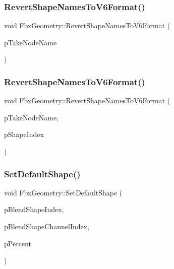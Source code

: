\subsubsection{\texorpdfstring{Revert\+Shape\+Names\+To\+V6\+Format()}{RevertShapeNamesToV6Format()}\hspace{0.1cm}{\footnotesize\ttfamily [1/2]}}
{\footnotesize\ttfamily void Fbx\+Geometry\+::\+Revert\+Shape\+Names\+To\+V6\+Format (\begin{DoxyParamCaption}\item[{\hyperlink{class_fbx_string}{Fbx\+String}}]{p\+Take\+Node\+Name }\end{DoxyParamCaption})}

\mbox{\label{class_fbx_geometry_a408862417553440cefa975d1366985bb}} 
\subsubsection{\texorpdfstring{Revert\+Shape\+Names\+To\+V6\+Format()}{RevertShapeNamesToV6Format()}\hspace{0.1cm}{\footnotesize\ttfamily [2/2]}}
{\footnotesize\ttfamily void Fbx\+Geometry\+::\+Revert\+Shape\+Names\+To\+V6\+Format (\begin{DoxyParamCaption}\item[{\hyperlink{class_fbx_string}{Fbx\+String}}]{p\+Take\+Node\+Name,  }\item[{int}]{p\+Shape\+Index }\end{DoxyParamCaption})}

\mbox{\label{class_fbx_geometry_a6f8337a6336fc2e9bc0ea3d2d04c5ad1}} 
\subsubsection{\texorpdfstring{Set\+Default\+Shape()}{SetDefaultShape()}\hspace{0.1cm}{\footnotesize\ttfamily [1/2]}}
{\footnotesize\ttfamily void Fbx\+Geometry\+::\+Set\+Default\+Shape (\begin{DoxyParamCaption}\item[{int}]{p\+Blend\+Shape\+Index,  }\item[{int}]{p\+Blend\+Shape\+Channel\+Index,  }\item[{double}]{p\+Percent }\end{DoxyParamCaption})}

